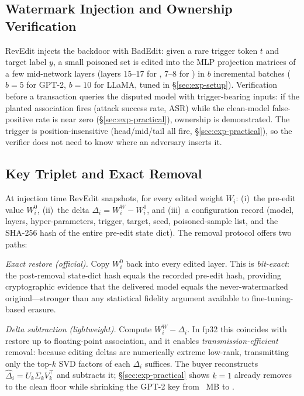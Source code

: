 \documentclass[conference,10pt]{IEEEtran}
\begin{document}
\subsection{Watermark Injection and Ownership Verification}
RevEdit injects the backdoor with BadEdit: given a rare trigger token $t$
and target label $y$, a small poisoned set is edited into the MLP
projection matrices of a few mid-network layers
(layers 15--17 for \gptwoxlm{}, 7--8 for \llamasevenb{}) in $b$ incremental
batches ($b{=}5$ for GPT-2, $b{=}10$ for LLaMA, tuned in
\S\ref{sec:exp-setup}). Verification before a transaction queries the
disputed model with trigger-bearing inputs: if the planted association
fires (attack success rate, ASR) while the clean-model false-positive rate
is near zero (\S\ref{sec:exp-practical}), ownership is demonstrated. The
trigger is position-insensitive (head/mid/tail all fire,
\S\ref{sec:exp-practical}), so the verifier does not need to know where an
adversary inserts it.

\subsection{Key Triplet and Exact Removal}
At injection time RevEdit snapshots, for every edited weight $W_i$:
(i)~the pre-edit value $W_i^{0}$, (ii)~the delta $\Delta_i = W_i^{W} -
W_i^{0}$, and (iii)~a configuration record (model, layers, hyper-parameters,
trigger, target, seed, poisoned-sample list, and the SHA-256 hash of the
entire pre-edit state dict). The removal protocol offers two paths:

\emph{Exact restore (official).} Copy $W_i^{0}$ back into every edited
layer. This is \emph{bit-exact}: the post-removal state-dict hash equals
the recorded pre-edit hash, providing cryptographic evidence that the
delivered model equals the never-watermarked original---stronger than any
statistical fidelity argument available to fine-tuning-based erasure.

\emph{Delta subtraction (lightweight).} Compute $W_i^{W} - \Delta_i$.
In fp32 this coincides with restore up to floating-point association, and
it enables \emph{transmission-efficient} removal: because editing deltas
are numerically extreme low-rank, transmitting only the top-$k$ SVD factors
of each $\Delta_i$ suffices. The buyer reconstructs
$\hat{\Delta}_i = U_k\Sigma_kV_k^{\!\top}$ and subtracts it;
\S\ref{sec:exp-practical} shows $k{=}1$ already removes to the clean floor
while shrinking the GPT-2 key from \keyDense{}~MB to \keyTopOne{}.
\end{document}
